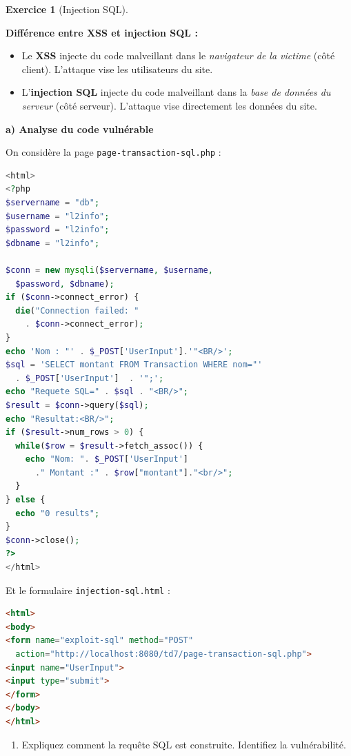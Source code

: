 \documentclass[a4paper,11pt]{article}
\theoremstyle{plain}
\theoremstyle{definition}
\newtheorem{exercice}{Exercice}
\begin{document}
\begin{exercice}[Injection SQL]

\begin{rappel}
\textbf{Différence entre XSS et injection SQL :}
\begin{itemize}
    \item Le \textbf{XSS} injecte du code malveillant dans le \textit{navigateur de la victime} (côté client). L'attaque vise les utilisateurs du site.
    \item L'\textbf{injection SQL} injecte du code malveillant dans la \textit{base de données du serveur} (côté serveur). L'attaque vise directement les données du site.
\end{itemize}
\end{rappel}

\medskip

\textbf{a) Analyse du code vulnérable}

\medskip

On considère la page \texttt{page-transaction-sql.php} :

\begin{lstlisting}[language=PHP]
<html>
<?php
$servername = "db";
$username = "l2info";
$password = "l2info";
$dbname = "l2info";

$conn = new mysqli($servername, $username,
  $password, $dbname);
if ($conn->connect_error) {
  die("Connection failed: "
    . $conn->connect_error);
}
echo 'Nom : "' . $_POST['UserInput'].'"<BR/>';
$sql = 'SELECT montant FROM Transaction WHERE nom="'
  . $_POST['UserInput']  . '";';
echo "Requete SQL=" . $sql . "<BR/>";
$result = $conn->query($sql);
echo "Resultat:<BR/>";
if ($result->num_rows > 0) {
  while($row = $result->fetch_assoc()) {
    echo "Nom: ". $_POST['UserInput']
      ." Montant :" . $row["montant"]."<br/>";
  }
} else {
  echo "0 results";
}
$conn->close();
?>
</html>
\end{lstlisting}

Et le formulaire \texttt{injection-sql.html} :

\begin{lstlisting}[language=HTML]
<html>
<body>
<form name="exploit-sql" method="POST"
  action="http://localhost:8080/td7/page-transaction-sql.php">
<input name="UserInput">
<input type="submit">
</form>
</body>
</html>
\end{lstlisting}

\begin{enumerate}
    \item Expliquez comment la requête SQL est construite. Identifiez la vulnérabilité.
\end{enumerate}


\end{exercice}
\end{document}
